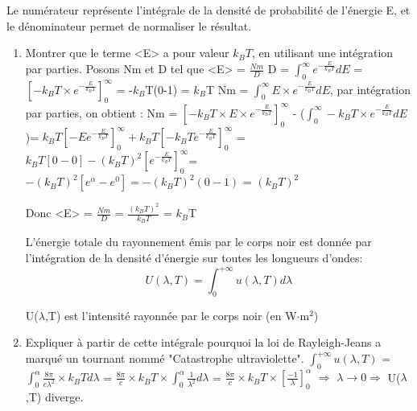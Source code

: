 \documentclass{article}
\begin{document}
\noindent
Le numérateur représente l'intégrale de la densité de probabilité de l'énergie E, et le dénominateur permet de normaliser le résultat.\newpage
\begin{enumerate}
    \item Montrer que le terme <E> a pour valeur $k_{B}T$, en utilisant une intégration par parties. \newline \newline\newline
    Posons Nm et D tel que <E> = $\frac{Nm}{D}$\newline\newline
    D = $\int_{0}^{\infty} e^{-\frac{E}{k_{B}T}} dE$ = $[-k_{B}T\times e^{-\frac{E}{k_{B}T}}]_{0}^{\infty}$ = -$k_{B}$T(0-1) = $k_{B}$T \newline \newline
    Nm = $\int_{0}^{\infty} E\times e^{-\frac{E}{k_{B}T}}dE$, par intégration par parties, on obtient :\newline\newline
    Nm = $[-k_{B}T\times E\times e^{-\frac{E}{k_{B}T}}]_{0}^{\infty}$ - ($\int_{0}^{\infty} -k_{B}T\times e^{-\frac{E}{k_{B}T}}dE$)\newline\newline = $k_{B}T [-Ee^{-\frac{E}{k_{B}T}}]_{0}^{\infty} + k_{B}T[-k_{B}Te^{-\frac{E}{k_{B}T}}]_{0}^{\infty}$ \newline\newline= $k_{B}T[0-0] - (k_{B}T)^{2} [e^{-\frac{E}{k_{B}T}}]_{0}^{\infty}$\newline\newline = $-(k_{B}T)^{2} [e^{\alpha} - e^{0}] = -(k_{B}T)^{2} (0-1)$ = $(k_{B}T)^{2}$ \newline\newline

    Donc <E> = $\frac{Nm}{D}$ = $\frac{(k_{B}T)^{2}}{k_{B}T}$ = $k_{B}$T\newline\newline

    L'énergie totale du rayonnement émis par le corps noir est donnée par l'intégration de la densité d'énergie sur toutes les longueurs d'ondes:
    \[ U(\lambda,T) = \int_{0}^{+\infty} u(\lambda,T)d\lambda\]

    U($\lambda$,T) est l'intensité rayonnée par le corps noir (en W$\cdot$m$^{2}$)
    \item Expliquer à partir de cette intégrale pourquoi la loi de Rayleigh-Jeans a marqué un tournant nommé "Catastrophe ultraviolette".\newline\newline\newline
    $\int_{0}^{+\infty} u(\lambda,T)$ = $\int_{0}^{\alpha} \frac{8\pi}{c\lambda^{2}}\times k_{B}T d\lambda$\newline\newline
    = $\frac{8\pi}{c}\times k_{B}T \times \int_{0}^{\alpha} \frac{1}{\lambda^{2}}d\lambda$ = $\frac{8\pi}{c}\times k_{B}T \times [\frac{-1}{\lambda}]_{0}^{\alpha}$\newline\newline
    $\Longrightarrow$ $\lambda \rightarrow 0 \Longrightarrow$ U($\lambda$,T) diverge.
\end{enumerate}
\end{document}
